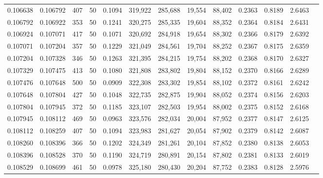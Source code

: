 \begin{tabular}{rrrrrrrrrrrrr}
0.106638 & 0.106792 &   407 &  50 &                                     0.1094 & 319,922 & 285,688 &  19,554 &  88,402 & 0.2363 & 0.8189 & 2.6463 \\
0.106792 & 0.106922 &   353 &  50 &                                     0.1241 & 320,275 & 285,335 &  19,604 &  88,352 & 0.2364 & 0.8184 & 2.6431 \\
0.106924 & 0.107071 &   417 &  50 &                                     0.1071 & 320,692 & 284,918 &  19,654 &  88,302 & 0.2366 & 0.8179 & 2.6392 \\
0.107071 & 0.107204 &   357 &  50 &                                     0.1229 & 321,049 & 284,561 &  19,704 &  88,252 & 0.2367 & 0.8175 & 2.6359 \\
0.107204 & 0.107328 &   346 &  50 &                                     0.1263 & 321,395 & 284,215 &  19,754 &  88,202 & 0.2368 & 0.8170 & 2.6327 \\
0.107329 & 0.107475 &   413 &  50 &                                     0.1080 & 321,808 & 283,802 &  19,804 &  88,152 & 0.2370 & 0.8166 & 2.6289 \\
0.107476 & 0.107648 &   500 &  50 &                                     0.0909 & 322,308 & 283,302 &  19,854 &  88,102 & 0.2372 & 0.8161 & 2.6242 \\
0.107648 & 0.107804 &   427 &  50 &                                     0.1048 & 322,735 & 282,875 &  19,904 &  88,052 & 0.2374 & 0.8156 & 2.6203 \\
0.107804 & 0.107945 &   372 &  50 &                                     0.1185 & 323,107 & 282,503 &  19,954 &  88,002 & 0.2375 & 0.8152 & 2.6168 \\
0.107945 & 0.108112 &   469 &  50 &                                     0.0963 & 323,576 & 282,034 &  20,004 &  87,952 & 0.2377 & 0.8147 & 2.6125 \\
0.108112 & 0.108259 &   407 &  50 &                                     0.1094 & 323,983 & 281,627 &  20,054 &  87,902 & 0.2379 & 0.8142 & 2.6087 \\
0.108260 & 0.108396 &   366 &  50 &                                     0.1202 & 324,349 & 281,261 &  20,104 &  87,852 & 0.2380 & 0.8138 & 2.6053 \\
0.108396 & 0.108528 &   370 &  50 &                                     0.1190 & 324,719 & 280,891 &  20,154 &  87,802 & 0.2381 & 0.8133 & 2.6019 \\
0.108529 & 0.108699 &   461 &  50 &                                     0.0978 & 325,180 & 280,430 &  20,204 &  87,752 & 0.2383 & 0.8128 & 2.5976 \\

\end{tabular}
